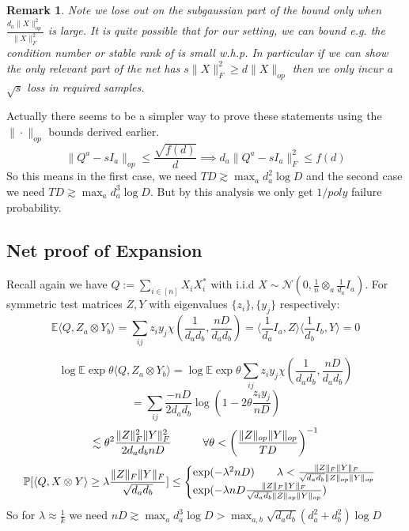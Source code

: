 \documentclass{article}
\newtheorem{remark}{Remark}
\newcommand{\E}{\mathbb{E}}
\renewcommand{\Pr}{\mathbb{P}}
\begin{document}
\begin{remark}
Note we lose out on the subgaussian part of the bound only when $\frac{d_{a} \|X\|_{op}^{2}}{\|X\|_{F}^{2}}$ is large. It is quite possible that for our setting, we can bound e.g. the condition number or stable rank of is small w.h.p. In particular if we can show the only relevant part of the net has $s \|X\|_{F}^{2} \geq d \|X\|_{op}$ then we only incur a $\sqrt{s}$ loss in required samples.
\end{remark}

Actually there seems to be a simpler way to prove these statements using the $\|\cdot\|_{op}$ bounds derived earlier.
\[ \|Q^{a} - sI_{a}\|_{op} \leq \frac{\sqrt{f(d)}}{d} \implies d_{a} \|Q^{a} - sI_{a}\|_{F}^{2} \leq f(d)  \]
So this means in the first case, we need $TD \gtrsim \max_{a} d_{a}^{2} \log D$ and the second case we need $TD \gtrsim \max_{a} d_{a}^{3} \log D$. But by this analysis we only get $1/poly$ failure probability.


\subsection{Net proof of Expansion}
Recall again we have $Q := \sum_{i \in [n]} X_{i} X_{i}^{*}$ with i.i.d $X \sim \mathcal{N}(0,\frac{1}{n} \otimes_{a} \frac{1}{d_{a}} I_{a})$. For symmetric test matrices $Z,Y$ with eigenvalues $\{z_{i}\},\{y_{j}\}$ respectively:
\[ \E \langle Q, Z_{a} \otimes Y_{b} \rangle = \sum_{ij} z_{i} y_{j} \chi(\frac{1}{d_{a} d_{b}}, \frac{nD}{d_{a} d_{b}}) = \langle \frac{1}{d_{a}} I_{a}, Z \rangle \langle \frac{1}{d_{b}} I_{b}, Y \rangle = 0 \]

\[ \log \E \exp \theta \langle Q, Z_{a} \otimes Y_{b} \rangle = \log \E \exp \theta \sum_{ij} z_{i} y_{j} \chi(\frac{1}{d_{a} d_{b}}, \frac{nD}{d_{a} d_{b}})  \]
\[ = \sum_{ij} \frac{-nD}{2 d_{a} d_{b}} \log \left( 1 - 2 \theta \frac{z_{i} y_{j}}{nD} \right)   \]
\[ \lesssim \theta^{2} \frac{\|Z\|_{F}^{2} \|Y\|_{F}^{2}}{2 d_{a} d_{b} nD} \hspace{10mm} \forall \theta < \left( \frac{\|Z\|_{op} \|Y\|_{op}}{TD} \right)^{-1}  \]
\[ \Pr[ \langle Q, X \otimes Y \rangle \geq \lambda \frac{\|Z\|_{F} \|Y\|_{F}}{\sqrt{d_{a} d_{b}}} ] \leq
\begin{cases}
\exp( - \lambda^{2} nD ) \hspace{7mm} \lambda  < \frac{\|Z\|_{F} \|Y\|_{F}}{\sqrt{d_{a} d_{b}} \|Z\|_{op} \|Y\|_{op}}
\\ \exp ( - \lambda nD \frac{\|Z\|_{F} \|Y\|_{F}}{ \sqrt{d_{a} d_{b}} \|Z\|_{op} \|Y\|_{op}} )
\end{cases}
\]
So for $\lambda \approx \frac{1}{k}$ we need $nD \gtrsim \max_{a} d_{a}^{3} \log D > \max_{a,b} \sqrt{d_{a} d_{b}} (d_{a}^{2} + d_{b}^{2}) \log D$
\end{document}
